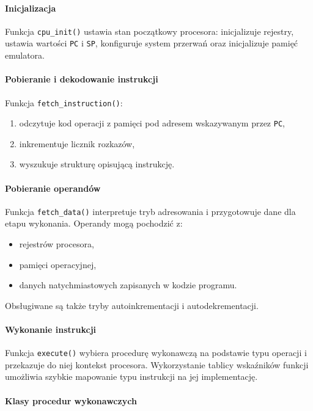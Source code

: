 \documentclass{article}
\begin{document}
\paragraph{Inicjalizacja}

Funkcja \texttt{cpu\_init()} ustawia stan początkowy procesora: inicjalizuje rejestry, ustawia wartości \texttt{PC} i \texttt{SP}, konfiguruje system przerwań oraz inicjalizuje pamięć emulatora.

\paragraph{Pobieranie i dekodowanie instrukcji}

Funkcja \texttt{fetch\_instruction()}:
\begin{enumerate}
	\item odczytuje kod operacji z pamięci pod adresem wskazywanym przez \texttt{PC},
	\item inkrementuje licznik rozkazów,
	\item wyszukuje strukturę opisującą instrukcję.
\end{enumerate}

\paragraph{Pobieranie operandów}

Funkcja \texttt{fetch\_data()} interpretuje tryb adresowania i przygotowuje dane dla etapu wykonania. Operandy mogą pochodzić z:
\begin{itemize}
	\item rejestrów procesora,
	\item pamięci operacyjnej,
	\item danych natychmiastowych zapisanych w kodzie programu.
\end{itemize}

Obsługiwane są także tryby autoinkrementacji i autodekrementacji.

\paragraph{Wykonanie instrukcji}

Funkcja \texttt{execute()} wybiera procedurę wykonawczą na podstawie typu operacji i przekazuje do niej kontekst procesora. Wykorzystanie tablicy wskaźników funkcji umożliwia szybkie mapowanie typu instrukcji na jej implementację.

\paragraph{Klasy procedur wykonawczych}
\end{document}
